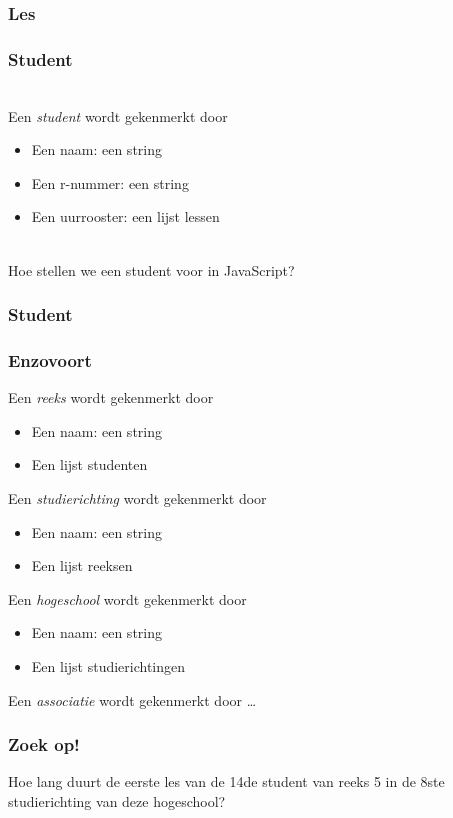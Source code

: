 \begin{frame}
  \frametitle{Les}
\end{frame}


\begin{frame}
  \frametitle{Student}
   \\
  Een \emph{student} wordt gekenmerkt door
  \begin{itemize}
    \item Een naam: een string
    \item Een r-nummer: een string
    \item Een uurrooster: een lijst lessen
  \end{itemize}
  \vskip4mm
   \\
  Hoe stellen we een student voor in JavaScript?
\end{frame}

\begin{frame}
  \frametitle{Student}
\end{frame}


\begin{frame}
  \frametitle{Enzovoort}
  Een \emph{reeks} wordt gekenmerkt door
  \begin{itemize}
    \item Een naam: een string
    \item Een lijst studenten
  \end{itemize}

  \vskip5mm

  Een \emph{studierichting} wordt gekenmerkt door
  \begin{itemize}
    \item Een naam: een string
    \item Een lijst reeksen
  \end{itemize}

  \vskip5mm

  Een \emph{hogeschool} wordt gekenmerkt door
  \begin{itemize}
    \item Een naam: een string
    \item Een lijst studierichtingen
  \end{itemize}

  \vskip5mm

  Een \emph{associatie} wordt gekenmerkt door \dots
\end{frame}


\begin{frame}
  \frametitle{Zoek op!}
  Hoe lang duurt de eerste les van de 14de student van reeks 5
  in de 8ste studierichting van deze hogeschool?

  \vskip10mm

\end{frame}


